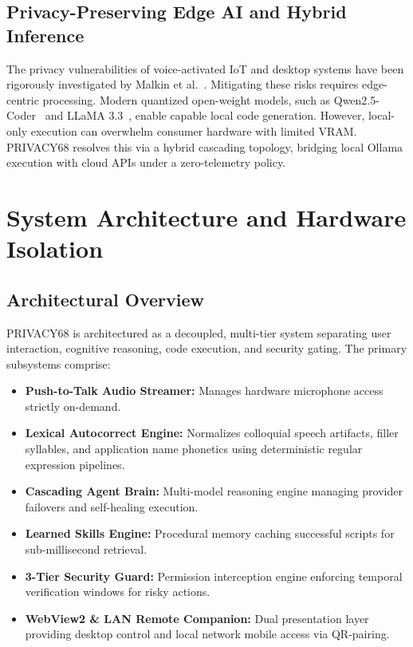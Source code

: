 \documentclass[conference]{IEEEtran}
\begin{document}
\subsection{Privacy-Preserving Edge AI and Hybrid Inference}
The privacy vulnerabilities of voice-activated IoT and desktop systems have been rigorously investigated by Malkin et al.~\cite{malkin2022privacy}. Mitigating these risks requires edge-centric processing. Modern quantized open-weight models, such as Qwen2.5-Coder~\cite{hui2024qwen25coder} and LLaMA 3.3~\cite{touvron2023llama}, enable capable local code generation. However, local-only execution can overwhelm consumer hardware with limited VRAM. PRIVACY68 resolves this via a hybrid cascading topology, bridging local Ollama execution with cloud APIs under a zero-telemetry policy.

\section{System Architecture and Hardware Isolation}
\label{sec:architecture}

\subsection{Architectural Overview}
PRIVACY68 is architectured as a decoupled, multi-tier system separating user interaction, cognitive reasoning, code execution, and security gating. The primary subsystems comprise:
\begin{itemize}
    \item \textbf{Push-to-Talk Audio Streamer:} Manages hardware microphone access strictly on-demand.
    \item \textbf{Lexical Autocorrect Engine:} Normalizes colloquial speech artifacts, filler syllables, and application name phonetics using deterministic regular expression pipelines.
    \item \textbf{Cascading Agent Brain:} Multi-model reasoning engine managing provider failovers and self-healing execution.
    \item \textbf{Learned Skills Engine:} Procedural memory caching successful scripts for sub-millisecond retrieval.
    \item \textbf{3-Tier Security Guard:} Permission interception engine enforcing temporal verification windows for risky actions.
    \item \textbf{WebView2 \& LAN Remote Companion:} Dual presentation layer providing desktop control and local network mobile access via QR-pairing.
\end{itemize}
\end{document}
